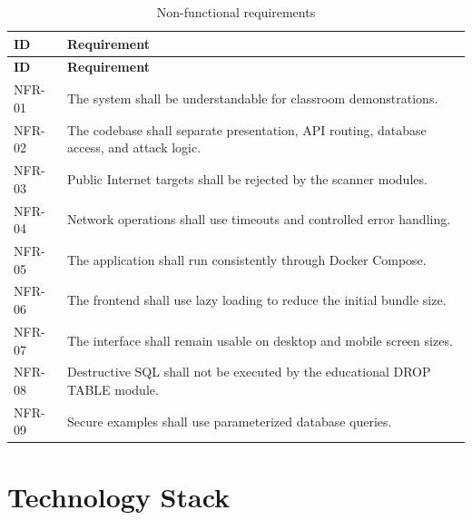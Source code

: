 \documentclass[12pt,a4paper]{article}
\begin{document}
\begin{longtable}{p{1.8cm}p{11.8cm}}
\caption{Non-functional requirements}\label{tab:nonfunctional-requirements}\\
\toprule
\textbf{ID} & \textbf{Requirement} \\
\midrule
\endfirsthead
\toprule
\textbf{ID} & \textbf{Requirement} \\
\midrule
\endhead
NFR-01 & The system shall be understandable for classroom demonstrations. \\
NFR-02 & The codebase shall separate presentation, API routing, database access, and attack logic. \\
NFR-03 & Public Internet targets shall be rejected by the scanner modules. \\
NFR-04 & Network operations shall use timeouts and controlled error handling. \\
NFR-05 & The application shall run consistently through Docker Compose. \\
NFR-06 & The frontend shall use lazy loading to reduce the initial bundle size. \\
NFR-07 & The interface shall remain usable on desktop and mobile screen sizes. \\
NFR-08 & Destructive SQL shall not be executed by the educational DROP TABLE module. \\
NFR-09 & Secure examples shall use parameterized database queries. \\
\bottomrule
\end{longtable}

\section{Technology Stack}
\end{document}
